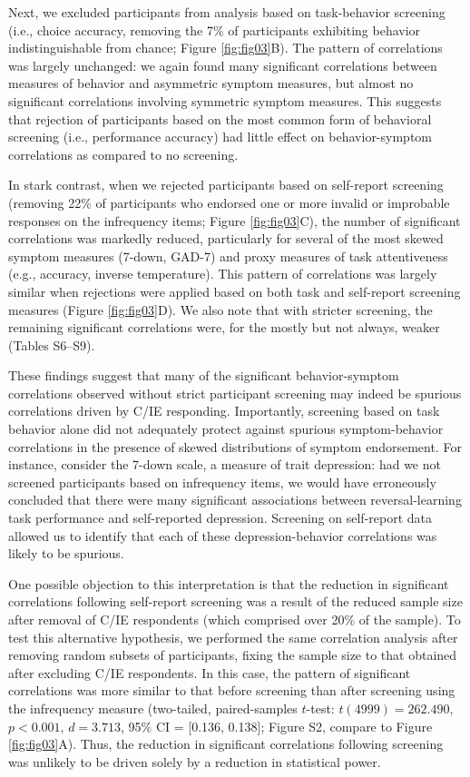 \documentclass[a4paper,notitlepage,12pt]{article}
\begin{document}
Next, we excluded participants from analysis based on task-behavior screening (i.e., choice accuracy, removing the 7\% of participants exhibiting behavior indistinguishable from chance; Figure \ref{fig:fig03}B). The pattern of correlations was largely unchanged: we again found many significant correlations between measures of behavior and asymmetric symptom measures, but almost no significant correlations involving symmetric symptom measures. This suggests that rejection of participants based on the most common form of behavioral screening (i.e., performance accuracy) had little effect on behavior-symptom correlations as compared to no screening.  

In stark contrast, when we rejected participants based on self-report screening  (removing 22\% of participants who endorsed one or more invalid or improbable responses on the infrequency items; Figure \ref{fig:fig03}C), the number of significant correlations was markedly reduced, particularly for several of the most skewed symptom measures (7-down, GAD-7) and proxy measures of task attentiveness (e.g., accuracy, inverse temperature). This pattern of correlations was largely similar when rejections were applied based on both task and self-report screening measures (Figure \ref{fig:fig03}D). We also note that with stricter screening, the remaining significant correlations were, for the mostly but not always, weaker (Tables S6--S9). 

These findings suggest that many of the significant behavior-symptom correlations observed without strict participant screening may indeed be spurious correlations driven by C/IE responding. Importantly, screening based on task behavior alone did not adequately protect against spurious symptom-behavior correlations in the presence of skewed distributions of symptom endorsement. For instance, consider the 7-down scale, a measure of trait depression: had we not screened participants based on infrequency items, we would have erroneously concluded that there were many significant associations between reversal-learning task performance and self-reported depression. Screening on self-report data allowed us to identify that each of these depression-behavior correlations was likely to be spurious.

One possible objection to this interpretation is that the reduction in significant correlations following self-report screening was a result of the reduced sample size after removal of C/IE respondents (which comprised over 20\% of the sample). To test this alternative hypothesis, we performed the same correlation analysis after removing random subsets of participants, fixing the sample size to that obtained after excluding C/IE respondents. In this case, the pattern of significant correlations was more similar to that before screening than after screening using the infrequency measure (two-tailed, paired-samples $t$-test: $t(4999) = 262.490$, $p < 0.001$, $d = 3.713$, 95\% CI = [0.136, 0.138]; Figure S2, compare to Figure \ref{fig:fig03}A). Thus, the reduction in significant correlations following screening was unlikely to be driven solely by a reduction in statistical power.
\end{document}
